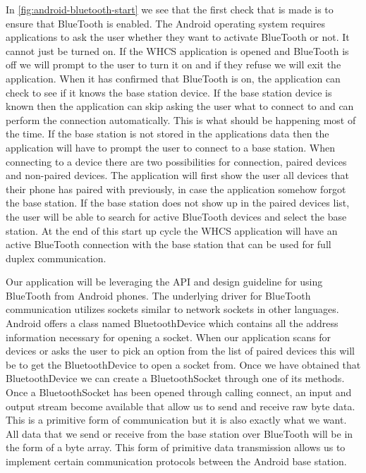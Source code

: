 
In \autoref{fig:android-bluetooth-start} we see that the first check that is
made is to ensure that BlueTooth is enabled. The Android operating system
requires applications to ask the user whether they want to activate BlueTooth
or not. It cannot just be turned on. If the WHCS application is opened and
BlueTooth is off we will prompt to the user to turn it on and if they refuse we
will exit the application. When it has confirmed that BlueTooth is on, the
application can check to see if it knows the base station device. If the base
station device is known then the application can skip asking the user what to
connect to and can perform the connection automatically. This is what should be
happening most of the time. If the base station is not stored in the
applications data then the application will have to prompt the user to connect
to a base station. When connecting to a device there are two possibilities for
connection, paired devices and non{}-paired devices. The application will first
show the user all devices that their phone has paired with previously, in case
the application somehow forgot the base station. If the base station does not
show up in the paired devices list, the user will be able to search for active
BlueTooth devices and select the base station. At the end of this start up
cycle the WHCS application will have an active BlueTooth connection with the
base station that can be used for full duplex communication.

Our application will be leveraging the API and design guideline for using
BlueTooth from Android phones. The underlying driver for BlueTooth
communication utilizes sockets similar to network sockets in other languages.
Android offers a class named BluetoothDevice which contains all the address
information necessary for opening a socket. When our application scans for
devices or asks the user to pick an option from the list of paired devices this
will be to get the BluetoothDevice to open a socket from. Once we have obtained
that BluetoothDevice we can create a BluetoothSocket through one of its
methods. Once a BluetoothSocket has been opened through calling connect, an
input and output stream become available that allow us to send and receive raw
byte data. This is a primitive form of communication but it is also exactly
what we want. All data that we send or receive from the base station over
BlueTooth will be in the form of a byte array. This form of primitive data
transmission allows us to implement certain communication protocols between the
Android base station.

